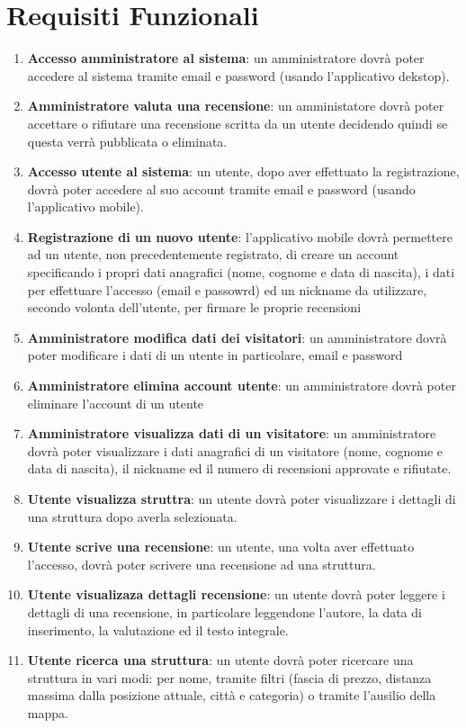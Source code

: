 \section{Requisiti Funzionali}
\begin{enumerate}
    \item  \textbf{Accesso amministratore al sistema}: un amministratore dovrà poter accedere al sistema tramite email e password (usando l'applicativo dekstop).
    \item  \textbf{Amministratore valuta una recensione}: un amministatore dovrà poter accettare o rifiutare una recensione scritta da un utente decidendo quindi se questa verrà pubblicata o eliminata.
    \item \textbf{Accesso utente al sistema}: un utente, dopo aver effettuato la registrazione, dovrà poter accedere al suo account tramite email e password (usando l'applicativo mobile). 
    \item  \textbf{Registrazione di un nuovo utente}: l'applicativo mobile dovrà permettere ad un utente, non precedentemente registrato, di creare un account specificando 
    i propri dati anagrafici (nome, cognome e data di nascita), i dati per effettuare l'accesso (email e passowrd) ed un nickname da utilizzare, secondo volonta dell'utente, per firmare  
    le proprie recensioni
    \item \textbf{Amministratore modifica dati dei visitatori}: un amministratore dovrà poter modificare i dati di un utente in particolare, email e password
    \item \textbf{Amministratore elimina account utente}: un amministratore dovrà poter eliminare l'account di un utente
    \item \textbf{Amministratore visualizza dati di un visitatore}: un amministratore dovrà poter visualizzare i dati anagrafici di un visitatore (nome, cognome e data di nascita), 
    il nickname ed il numero di recensioni approvate e rifiutate.
    \item \textbf{Utente visualizza struttra}: un utente dovrà poter visualizzare i dettagli di una struttura dopo averla selezionata.
    \item \textbf{Utente scrive una recensione}: un utente, una volta aver effettuato l'accesso, dovrà poter scrivere una recensione ad una struttura.
    \item \textbf{Utente visualizaza dettagli recensione}: un utente dovrà poter leggere i dettagli di una recensione, in particolare leggendone l'autore, la data di inserimento, la valutazione
    ed il testo integrale.
    \item \textbf{Utente ricerca una struttura}: un utente dovrà poter ricercare una struttura in vari modi: per nome, tramite filtri (fascia di prezzo, distanza massima dalla posizione attuale, 
    città e categoria) o tramite l'ausilio della mappa.
\end{enumerate}
